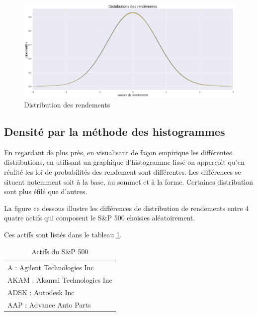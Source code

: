 \begin{figure}[H]
\centering
\caption{Distribution des rendements}
   \includegraphics[scale=0.35]{img/distrib.png}
\end{figure}

\subsection{Densité par la méthode des histogrammes}

En regardant de plus près, en visualisant de façon empirique les différentes distributions, en utilisant un graphique d’histogramme lissé on appercoit qu'en réalité les loi de probabilités des rendement sont différentes. Les différences se situent notemment soit à la base, au sommet et à la forme. Certaines distribution sont plus éfilé que d'autres. 

La figure ce dessous illustre les différences de distribution de rendements entre 4 quatre  actifs qui composent le S\&P 500 choisies aléatoirement.

Ces actifs sont listés dans le tableau \ref{actif}.

\begin{table}[H]
\centering
\caption{Actifs du S\&P 500}
\label{actif}
\begin{tabular}{|l|}
\hline
A : Agilent Technologies Inc \\
AKAM : Akamai Technologies Inc \\
ADSK : Autodesk Inc \\
AAP : Advance Auto Parts \\ \hline
\end{tabular}
\end{table}

